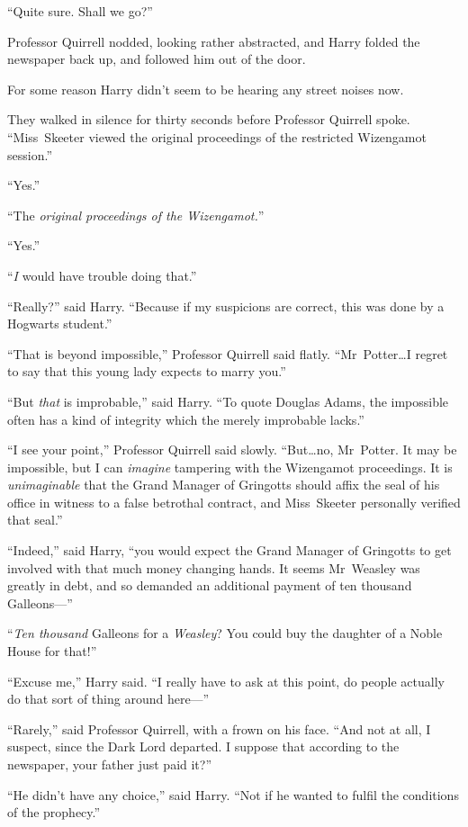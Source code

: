 “Quite sure. Shall we go?”

Professor Quirrell nodded, looking rather abstracted, and Harry folded the newspaper back up, and followed him out of the door.

For some reason Harry didn’t seem to be hearing any street noises now.

They walked in silence for thirty seconds before Professor Quirrell spoke. “Miss~Skeeter viewed the original proceedings of the restricted Wizengamot session.”

“Yes.”

“The \emph{original proceedings of the Wizengamot.}”

“Yes.”

“\emph{I} would have trouble doing that.”

“Really?” said Harry. “Because if my suspicions are correct, this was done by a Hogwarts student.”

“That is beyond impossible,” Professor Quirrell said flatly. “Mr~Potter…I regret to say that this young lady expects to marry you.”

“But \emph{that} is improbable,” said Harry. “To quote Douglas Adams, the impossible often has a kind of integrity which the merely improbable lacks.”

“I see your point,” Professor Quirrell said slowly. “But…no, Mr~Potter. It may be impossible, but I can \emph{imagine} tampering with the Wizengamot proceedings. It is \emph{unimaginable} that the Grand Manager of Gringotts should affix the seal of his office in witness to a false betrothal contract, and Miss~Skeeter personally verified that seal.”

“Indeed,” said Harry, “you would expect the Grand Manager of Gringotts to get involved with that much money changing hands. It seems Mr~Weasley was greatly in debt, and so demanded an additional payment of ten thousand Galleons—”

“\emph{Ten thousand} Galleons for a \emph{Weasley}? You could buy the daughter of a Noble House for that!”

“Excuse me,” Harry said. “I really have to ask at this point, do people actually do that sort of thing around here—”

“Rarely,” said Professor Quirrell, with a frown on his face. “And not at all, I suspect, since the Dark Lord departed. I suppose that according to the newspaper, your father just paid it?”

“He didn’t have any choice,” said Harry. “Not if he wanted to fulfil the conditions of the prophecy.”

